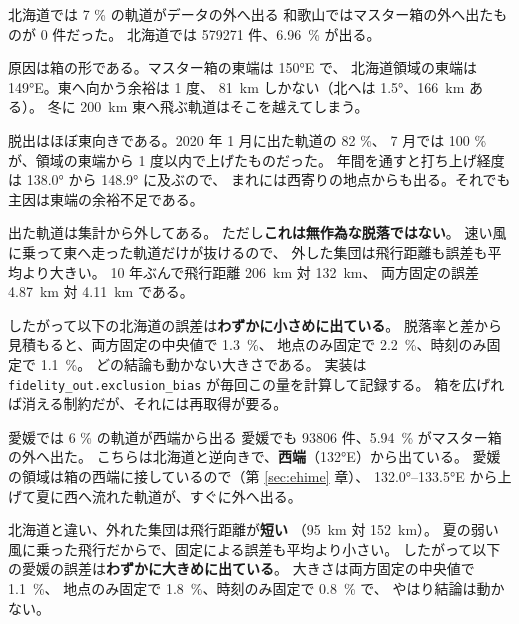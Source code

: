 \begin{whybox}{北海道では 7 \% の軌道がデータの外へ出る}
和歌山ではマスター箱の外へ出たものが 0 件だった。
北海道では \num{579271} 件、\SI{6.96}{\percent} が出る。

原因は箱の形である。マスター箱の東端は \ang{150}E で、
北海道領域の東端は \ang{149}E。東へ向かう余裕は 1 度、
\SI{81}{\kilo\metre} しかない（北へは \ang{1.5}、\SI{166}{\kilo\metre} ある）。
冬に \SI{200}{\kilo\metre} 東へ飛ぶ軌道はそこを越えてしまう。

脱出はほぼ東向きである。2020 年 1 月に出た軌道の 82 \%、
7 月では 100 \% が、領域の東端から 1 度以内で上げたものだった。
年間を通すと打ち上げ経度は \ang{138.0} から \ang{148.9} に及ぶので、
まれには西寄りの地点からも出る。それでも主因は東端の余裕不足である。

出た軌道は集計から外してある。
ただし\textbf{これは無作為な脱落ではない}。
速い風に乗って東へ走った軌道だけが抜けるので、
外した集団は飛行距離も誤差も平均より大きい。
10 年ぶんで飛行距離 \SI{206}{\kilo\metre} 対 \SI{132}{\kilo\metre}、
両方固定の誤差 \SI{4.87}{\kilo\metre} 対 \SI{4.11}{\kilo\metre} である。

したがって以下の北海道の誤差は\textbf{わずかに小さめに出ている}。
脱落率と差から見積もると、両方固定の中央値で \SI{1.3}{\percent}、
地点のみ固定で \SI{2.2}{\percent}、時刻のみ固定で \SI{1.1}{\percent}。
どの結論も動かない大きさである。
実装は \texttt{fidelity\_out.exclusion\_bias} が毎回この量を計算して記録する。
箱を広げれば消える制約だが、それには再取得が要る。
\end{whybox}

\begin{whybox}{愛媛では 6 \% の軌道が西端から出る}
愛媛でも \num{93806} 件、\SI{5.94}{\percent} がマスター箱の外へ出た。
こちらは北海道と逆向きで、\textbf{西端}（\ang{132}E）から出ている。
愛媛の領域は箱の西端に接しているので（第 \ref{sec:ehime} 章）、
\ang{132.0}--\ang{133.5}E から上げて夏に西へ流れた軌道が、すぐに外へ出る。

北海道と違い、外れた集団は飛行距離が\textbf{短い}
（\SI{95}{\kilo\metre} 対 \SI{152}{\kilo\metre}）。
夏の弱い風に乗った飛行だからで、固定による誤差も平均より小さい。
したがって以下の愛媛の誤差は\textbf{わずかに大きめに出ている}。
大きさは両方固定の中央値で \SI{1.1}{\percent}、
地点のみ固定で \SI{1.8}{\percent}、時刻のみ固定で \SI{0.8}{\percent} で、
やはり結論は動かない。
\end{whybox}






